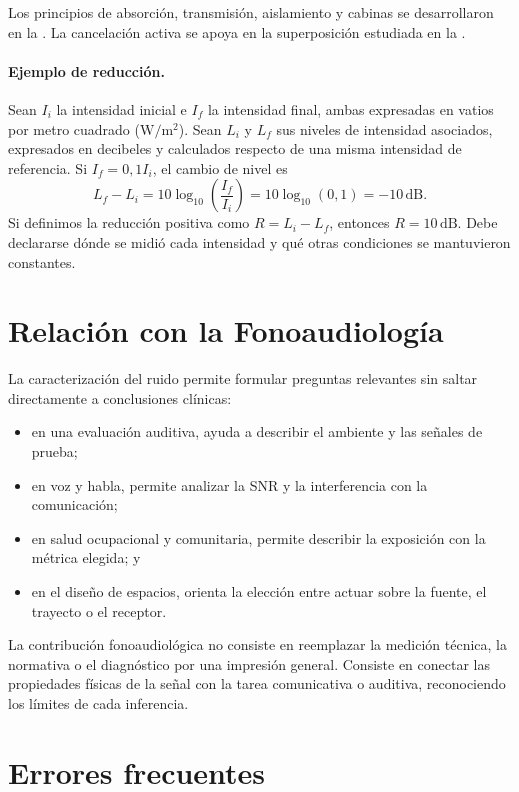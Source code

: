 Los principios de absorción, transmisión, aislamiento y cabinas se
desarrollaron en la . La cancelación activa se apoya
en la superposición estudiada en la .

\paragraph{Ejemplo de reducción.}
Sean \(I_i\) la intensidad inicial e \(I_f\) la intensidad final, ambas
expresadas en vatios por metro cuadrado (\(\mathrm{W/m^2}\)). Sean \(L_i\) y
\(L_f\) sus niveles de intensidad asociados, expresados en decibeles y
calculados respecto de una misma intensidad de referencia. Si
\(I_f=0{,}1I_i\), el cambio de nivel es
\[
L_f-L_i
=10\log_{10}\left(\frac{I_f}{I_i}\right)
=10\log_{10}(0{,}1)=-10\,\mathrm{dB}.
\]
Si definimos la reducción positiva como
\(R=L_i-L_f\), entonces
\(R=10\,\mathrm{dB}\). Debe declararse dónde se midió cada intensidad y qué
otras condiciones se mantuvieron constantes.

\section{Relación con la Fonoaudiología}
\label{sec:u10-fonoaudiologia}

La caracterización del ruido permite formular preguntas relevantes sin saltar
directamente a conclusiones clínicas:
\begin{itemize}
    \item en una evaluación auditiva, ayuda a describir el ambiente y las
    señales de prueba;
    \item en voz y habla, permite analizar la SNR y la interferencia con la
    comunicación;
    \item en salud ocupacional y comunitaria, permite describir la exposición
    con la métrica elegida; y
    \item en el diseño de espacios, orienta la elección entre actuar sobre la
    fuente, el trayecto o el receptor.
\end{itemize}

La contribución fonoaudiológica no consiste en reemplazar la medición técnica,
la normativa o el diagnóstico por una impresión general. Consiste en conectar
las propiedades físicas de la señal con la tarea comunicativa o auditiva,
reconociendo los límites de cada inferencia.

\section{Errores frecuentes}
\label{sec:u10-errores}

